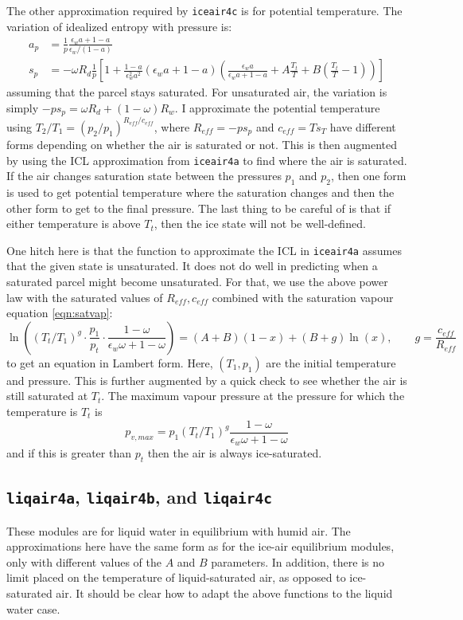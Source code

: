 \documentclass{article}
\newcommand{\epsw}{\epsilon_w}
\begin{document}
The other approximation required by \texttt{iceair4c} is for potential temperature. The variation of idealized entropy with pressure is:
\begin{align*}
    a_p &= \frac{1}{p} \frac{\epsw a + 1-a}{\epsw/(1-a)} \\
    s_p &= -\omega R_d \frac{1}{p} \left[ 1 + \frac{1-a}{\epsw^2 a^2} (\epsw a + 1-a) \left( \frac{\epsw a}{\epsw a + 1-a} + A \frac{T_t}{T} + B \left( \frac{T_t}{T} - 1 \right) \right) \right]
\end{align*}
assuming that the parcel stays saturated. For unsaturated air, the variation is simply $-p s_p = \omega R_d + (1-\omega) R_w$. I approximate the potential temperature using $T_2/T_1 = (p_2/p_1)^{R_{eff}/c_{eff}}$, where $R_{eff} = -p s_p$ and $c_{eff} = T s_T$ have different forms depending on whether the air is saturated or not. This is then augmented by using the ICL approximation from \texttt{iceair4a} to find where the air is saturated. If the air changes saturation state between the pressures $p_1$ and $p_2$, then one form is used to get potential temperature where the saturation changes and then the other form to get to the final pressure. The last thing to be careful of is that if either temperature is above $T_t$, then the ice state will not be well-defined.

One hitch here is that the function to approximate the ICL in \texttt{iceair4a} assumes that the given state is unsaturated. It does not do well in predicting when a saturated parcel might become unsaturated. For that, we use the above power law with the saturated values of $R_{eff}, c_{eff}$ combined with the saturation vapour equation \ref{eqn:satvap}:
\begin{equation*}
    \ln\left( (T_t/T_1)^g \cdot \frac{p_1}{p_t} \cdot \frac{1-\omega}{\epsw \omega + 1-\omega} \right) = (A+B) (1 - x) + (B+g) \ln(x), \qquad g = \frac{c_{eff}}{R_{eff}}
\end{equation*}
to get an equation in Lambert form. Here, $(T_1,p_1)$ are the initial temperature and pressure. This is further augmented by a quick check to see whether the air is still saturated at $T_t$. The maximum vapour pressure at the pressure for which the temperature is $T_t$ is
\begin{equation*}
    p_{v,max} = p_1 (T_t/T_1)^g \frac{1-\omega}{\epsw \omega + 1-\omega}
\end{equation*}
and if this is greater than $p_t$ then the air is always ice-saturated.


\subsection{\texttt{liqair4a}, \texttt{liqair4b}, and \texttt{liqair4c}}

These modules are for liquid water in equilibrium with humid air. The approximations here have the same form as for the ice-air equilibrium modules, only with different values of the $A$ and $B$ parameters. In addition, there is no limit placed on the temperature of liquid-saturated air, as opposed to ice-saturated air. It should be clear how to adapt the above functions to the liquid water case.
\end{document}
